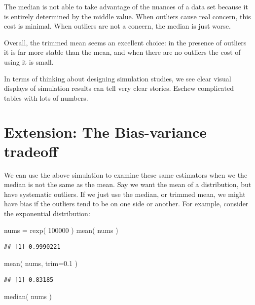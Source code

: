 \documentclass[
]{book}
\newenvironment{Shaded}{\begin{snugshade}}{\end{snugshade}}
\newcommand{\AttributeTok}[1]{\textcolor[rgb]{0.77,0.63,0.00}{#1}}
\newcommand{\DecValTok}[1]{\textcolor[rgb]{0.00,0.00,0.81}{#1}}
\newcommand{\FloatTok}[1]{\textcolor[rgb]{0.00,0.00,0.81}{#1}}
\newcommand{\FunctionTok}[1]{\textcolor[rgb]{0.00,0.00,0.00}{#1}}
\newcommand{\NormalTok}[1]{#1}
\newcommand{\OtherTok}[1]{\textcolor[rgb]{0.56,0.35,0.01}{#1}}
\begin{document}
The median is not able to take advantage of the nuances of a data set because
it is entirely determined by the middle value. When outliers cause real
concern, this cost is minimal. When outliers are not a concern, the median is
just worse.

Overall, the trimmed mean seems an excellent choice: in the presence of
outliers it is far more stable than the mean, and when there are no outliers
the cost of using it is small.

In terms of thinking about designing simulation studies, we see clear
visual displays of simulation results can tell very clear stories. Eschew
complicated tables with lots of numbers.

\hypertarget{extension-the-bias-variance-tradeoff}{%
\section{Extension: The Bias-variance tradeoff}\label{extension-the-bias-variance-tradeoff}}

We can use the above simulation to examine these same estimators when we the
median is not the same as the mean. Say we want the mean of a distribution,
but have systematic outliers. If we just use the median, or trimmed mean, we
might have bias if the outliers tend to be on one side or another. For
example, consider the exponential distribution:

\begin{Shaded}
\begin{Highlighting}[]
\NormalTok{nums }\OtherTok{=} \FunctionTok{rexp}\NormalTok{( }\DecValTok{100000}\NormalTok{ )}
\FunctionTok{mean}\NormalTok{( nums )}
\end{Highlighting}
\end{Shaded}

\begin{verbatim}
## [1] 0.9990221
\end{verbatim}

\begin{Shaded}
\begin{Highlighting}[]
\FunctionTok{mean}\NormalTok{( nums, }\AttributeTok{trim=}\FloatTok{0.1}\NormalTok{ )}
\end{Highlighting}
\end{Shaded}

\begin{verbatim}
## [1] 0.83185
\end{verbatim}

\begin{Shaded}
\begin{Highlighting}[]
\FunctionTok{median}\NormalTok{( nums )}
\end{Highlighting}
\end{Shaded}
\end{document}
